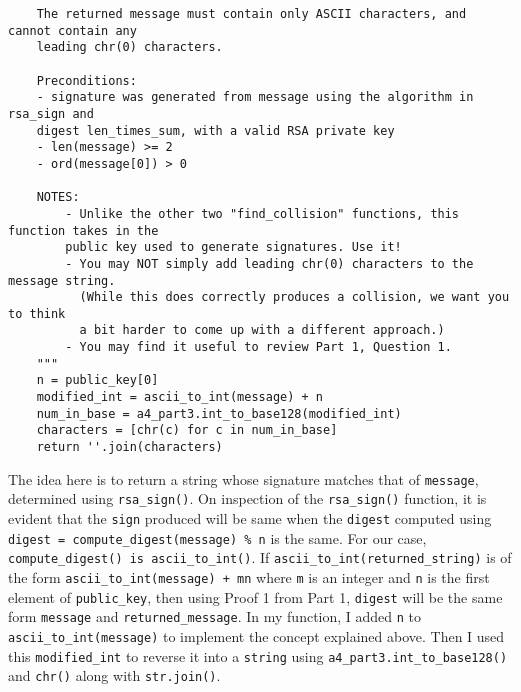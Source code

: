 \documentclass[11pt]{article}
\begin{document}
\begin{enumerate}
\begin{verbatim}
    The returned message must contain only ASCII characters, and cannot contain any 
    leading chr(0) characters.

    Preconditions:
    - signature was generated from message using the algorithm in rsa_sign and 
    digest len_times_sum, with a valid RSA private key
    - len(message) >= 2
    - ord(message[0]) > 0

    NOTES:
        - Unlike the other two "find_collision" functions, this function takes in the 
        public key used to generate signatures. Use it!
        - You may NOT simply add leading chr(0) characters to the message string.
          (While this does correctly produces a collision, we want you to think 
          a bit harder to come up with a different approach.)
        - You may find it useful to review Part 1, Question 1.
    """
    n = public_key[0]
    modified_int = ascii_to_int(message) + n
    num_in_base = a4_part3.int_to_base128(modified_int)
    characters = [chr(c) for c in num_in_base]
    return ''.join(characters)

\end{verbatim}

The idea here is to return a string whose signature matches that of \texttt{message}, determined using \texttt{rsa\_sign()}. On inspection of the \texttt{rsa\_sign()} function, it is evident that the \texttt{sign} produced will be same when the \texttt{digest} computed using \texttt{digest = compute\_digest(message) \% n} is the same. For our case, \texttt{compute\_digest() is ascii\_to\_int()}. If  \texttt{ascii\_to\_int(returned\_string)} is of the form \texttt{ascii\_to\_int(message) + mn} where \texttt{m} is an integer and \texttt{n} is the first element of \texttt{public\_key}, then using Proof 1 from Part 1, \texttt{digest} will be the same form \texttt{message} and \texttt{returned\_message}.
\newline \newline
In my function, I added \texttt{n} to \texttt{ascii\_to\_int(message)} to implement the concept explained above. Then I used this \texttt{modified\_int} to reverse it into a \texttt{string} using \texttt{a4\_part3.int\_to\_base128()} and \texttt{chr()} along with \texttt{str.join()}.

\end{enumerate}
\end{document}
